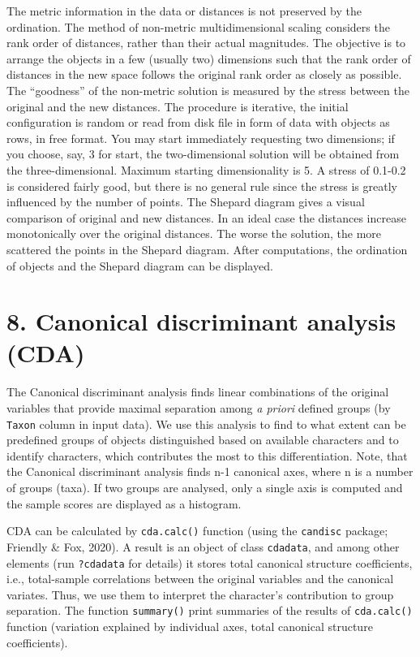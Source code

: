 \documentclass[
]{article}
\begin{document}
The metric information in the data or distances is not preserved by the
ordination. The method of non-metric multidimensional scaling considers
the rank order of distances, rather than their actual magnitudes. The
objective is to arrange the objects in a few (usually two) dimensions
such that the rank order of distances in the new space follows the
original rank order as closely as possible. The ``goodness'' of the
non-metric solution is measured by the stress between the original and
the new distances. The procedure is iterative, the initial configuration
is random or read from disk file in form of data with objects as rows,
in free format. You may start immediately requesting two dimensions; if
you choose, say, 3 for start, the two-dimensional solution will be
obtained from the three-dimensional. Maximum starting dimensionality is
5. A stress of 0.1-0.2 is considered fairly good, but there is no
general rule since the stress is greatly influenced by the number of
points. The Shepard diagram gives a visual comparison of original and
new distances. In an ideal case the distances increase monotonically
over the original distances. The worse the solution, the more scattered
the points in the Shepard diagram. After computations, the ordination of
objects and the Shepard diagram can be displayed.

\hypertarget{canonical-discriminant-analysis-cda}{%
\section{8. Canonical discriminant analysis
(CDA)}\label{canonical-discriminant-analysis-cda}}

The Canonical discriminant analysis finds linear combinations of the
original variables that provide maximal separation among \emph{a priori}
defined groups (by \texttt{Taxon} column in input data). We use this
analysis to find to what extent can be predefined groups of objects
distinguished based on available characters and to identify characters,
which contributes the most to this differentiation. Note, that the
Canonical discriminant analysis finds n-1 canonical axes, where n is a
number of groups (taxa). If two groups are analysed, only a single axis
is computed and the sample scores are displayed as a histogram.

CDA can be calculated by \texttt{cda.calc()} function (using the
\texttt{candisc} package; Friendly \& Fox, 2020). A result is an object
of class \texttt{cdadata}, and among other elements (run
\texttt{?cdadata} for details) it stores total canonical structure
coefficients, i.e., total-sample correlations between the original
variables and the canonical variates. Thus, we use them to interpret the
character's contribution to group separation. The function
\texttt{summary()} print summaries of the results of \texttt{cda.calc()}
function (variation explained by individual axes, total canonical
structure coefficients).
\end{document}
